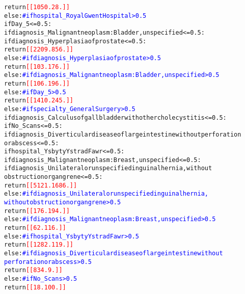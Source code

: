 \documentclass[thesis.tex]{subfiles}
\begin{document}
{\begin{alltt}
                        return \textcolor{red}{[[1050. 28.]]}
                    else:  \textcolor{blue}{# if hospital_Royal Gwent Hospital > 0.5}
                        if Day_5 <= 0.5:
                            if diagnosis_Malignant neoplasm: Bladder, unspecified <= 0.5:
                                if diagnosis_Hyperplasia of prostate <= 0.5:
                                    return \textcolor{red}{[[2209.  856.]]}
                                else:  \textcolor{blue}{# if diagnosis_Hyperplasia of prostate > 0.5}
                                    return \textcolor{red}{[[103. 176.]]}
                            else:  \textcolor{blue}{# if diagnosis_Malignant neoplasm: Bladder, unspecified > 0.5}
                                return \textcolor{red}{[[106. 196.]]}
                        else:  \textcolor{blue}{# if Day_5 > 0.5}
                            return \textcolor{red}{[[1410.  245.]]}
            else:  \textcolor{blue}{# if specialty_General Surgery > 0.5}
                if diagnosis_Calculus of gallbladder with other cholecystitis <= 0.5:
                    if No_Scans <= 0.5:
                        if diagnosis_Diverticular disease of large intestine without perforation
                        or abscess <= 0.5:
                            if hospital_Ysbyty Ystrad Fawr <= 0.5:
                                if diagnosis_Malignant neoplasm: Breast, unspecified <= 0.5:
                                    if diagnosis_Unilateral or unspecified inguinal hernia, without
                                    obstruction or gangrene <= 0.5:
                                        return \textcolor{red}{[[5121. 1686.]]}
                                    else:  \textcolor{blue}{# if diagnosis_Unilateral or unspecified inguinal hernia,
                                    without obstruction or gangrene > 0.5}
                                        return \textcolor{red}{[[176. 194.]]}
                                else:  \textcolor{blue}{# if diagnosis_Malignant neoplasm: Breast, unspecified > 0.5}
                                    return \textcolor{red}{[[ 62. 116.]]}
                            else:  \textcolor{blue}{# if hospital_Ysbyty Ystrad Fawr > 0.5}
                                return \textcolor{red}{[[1282.  119.]]}
                        else:  \textcolor{blue}{# if diagnosis_Diverticular disease of large intestine without
                        perforation or abscess > 0.5}
                            return \textcolor{red}{[[834.   9.]]}
                    else:  \textcolor{blue}{# if No_Scans > 0.5}
                        return \textcolor{red}{[[ 18. 100.]]}

\end{alltt}}
\end{document}

